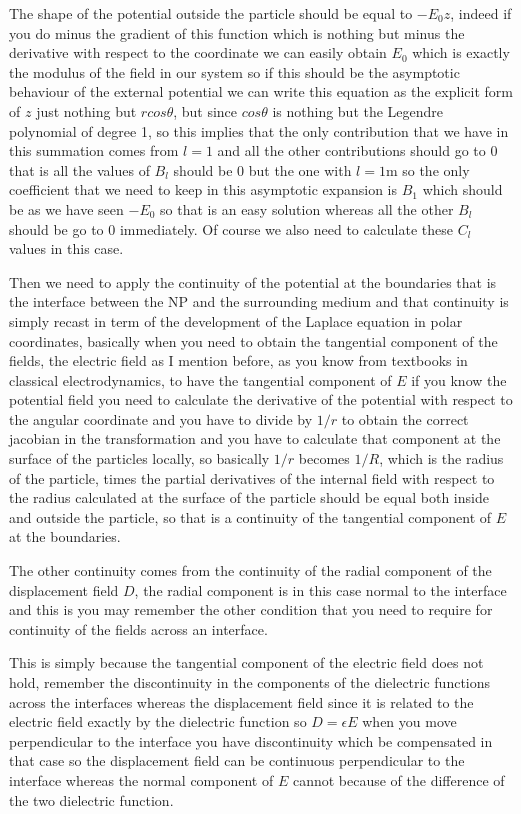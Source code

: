 \documentclass[../main/main.tex]{subfiles}
\begin{document}
The shape of the potential outside the particle should be equal to $-E_0 z$, indeed if you do minus the gradient of this function which is nothing but minus the derivative with respect to the coordinate we can easily obtain $E_0$ which is exactly the modulus of the field in our system so if this should be the asymptotic behaviour of the external potential we can write this equation as the explicit form of $z$ just nothing but $rcos\theta$, but since $cos\theta$ is nothing but the Legendre polynomial of degree 1, so this implies that the only contribution that we have in this summation comes from $l=1$ and all the other contributions should go to $0$ that is all the values of $B_l$ should be $0$ but the one with $l=1$m so the only coefficient that we need to keep in this asymptotic expansion is $B_1$ which should be as we have seen $-E_0$ so that is an easy solution whereas all the other $B_l$ should be go to $0$ immediately. Of course we also need to calculate these $C_l$ values in this case. 

Then we need to apply the continuity of the potential at the boundaries that is the interface between the NP and the surrounding medium and that continuity is simply recast in term of the development of the Laplace equation in polar coordinates, basically when you need to obtain the tangential component of the fields, the electric field as I mention before, as you know from textbooks in classical electrodynamics, to have the tangential component of $E$ if you know the potential field you need to calculate the derivative of the potential with respect to the angular coordinate and you have to divide by $1/r$ to obtain the correct jacobian in the transformation and you have to calculate that component at the surface of the particles locally, so basically $1/r$ becomes $1/R$, which is the radius of the particle, times the partial derivatives of the internal field with respect to the radius calculated at the surface of the particle should be equal both inside and outside the particle, so that is a continuity of the tangential component of $E$ at the boundaries.

The other continuity comes from the continuity of the radial component of the displacement field $D$, the radial component is in this case normal to the interface and this is you may remember the other condition that you need to require for continuity of the fields across an interface. 

This is simply because the tangential component of the electric field does not hold, remember the discontinuity in the components of the dielectric functions across the interfaces whereas the displacement field since it is related to the electric field exactly by the dielectric function so $D=\epsilon E$ when you move perpendicular to the interface you have discontinuity which be compensated in that case so the displacement field can be continuous perpendicular to the interface whereas the normal component of $E$ cannot because of the difference of the two dielectric function.
\end{document}
